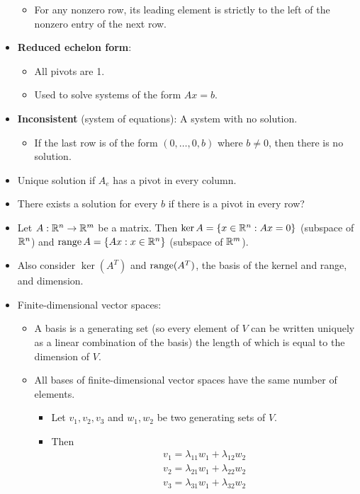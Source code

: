 \documentclass[../../notes.tex]{subfiles}
\begin{document}
\begin{itemize}
\begin{itemize}
        \item For any nonzero row, its leading element is strictly to the left of the nonzero entry of the next row.
    \end{itemize}
    \item \textbf{Reduced echelon form}:
    \begin{itemize}
        \item All pivots are 1.
        \item Used to solve systems of the form $Ax=b$.
    \end{itemize}
    \item \textbf{Inconsistent} (system of equations): A system with no solution.
    \begin{itemize}
        \item If the last row is of the form $(0,\dots,0,b)$ where $b\neq 0$, then there is no solution.
    \end{itemize}
    \item Unique solution if $A_e$ has a pivot in every column.
    \item There exists a solution for every $b$ if there is a pivot in every row?
    \item Let $A:\mathbb{R}^n\to\mathbb{R}^m$ be a matrix. Then $\ker A=\{x\in\mathbb{R}^n:Ax=0\}$ (subspace of $\mathbb{R}^n$) and $\operatorname{range} A=\{Ax:x\in\mathbb{R}^n\}$ (subspace of $\mathbb{R}^m$).
    \item Also consider $\ker(A^T)$ and $\operatorname{range}(A^T)$, the basis of the kernel and range, and dimension.
    \item Finite-dimensional vector spaces:
    \begin{itemize}
        \item A basis is a generating set (so every element of $V$ can be written uniquely as a linear combination of the basis) the length of which is equal to the dimension of $V$.
        \item All bases of finite-dimensional vector spaces have the same number of elements.
        \begin{itemize}
            \item Let $v_1,v_2,v_3$ and $w_1,w_2$ be two generating sets of $V$.
            \item Then
            \begin{gather*}
                v_1 = \lambda_{11}w_1+\lambda_{12}w_2\\
                v_2 = \lambda_{21}w_1+\lambda_{22}w_2\\
                v_3 = \lambda_{31}w_1+\lambda_{32}w_2
            \end{gather*}

\end{itemize}
\end{itemize}
\end{itemize}
\end{document}
